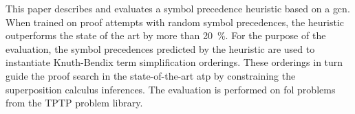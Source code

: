 

This paper describes and evaluates a symbol precedence heuristic based on a \acrlong{gcn}.
When trained on proof attempts with random symbol precedences,
the heuristic outperforms the state of the art by more than 20~\%.
For the purpose of the evaluation, the symbol precedences predicted by the heuristic
are used to instantiate Knuth-Bendix term simplification orderings.
These orderings in turn guide the proof search in the state-of-the-art \acrlong{atp} \vampire{}
by constraining the superposition calculus inferences.
The evaluation is performed on \acrlong{fol} problems from the TPTP problem library.

